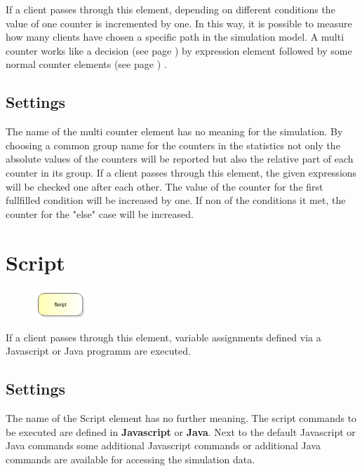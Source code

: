 If a client passes through this element, depending on different conditions the value
of one counter is incremented by one. In this way, it is possible to measure how many
clients have chosen a specific path in the simulation model. A multi counter works
like a decision (see page \pageref{ref:ModelElementDecide}) by expression element followed
by some normal counter elements (see page \pageref{ref:ModelElementCounter}) .

\subsection*{Settings}

The name of the multi counter element has no meaning for the simulation. By choosing
a common group name for the counters in the statistics not only the absolute values
of the counters will be reported but also the relative part of each counter in its
group. If a client passes through this element, the given expressions will be checked
one after each other. The value of the counter for the first fullfilled condition will
be increased by one. If non of the conditions it met, the counter for the "else" case
will be increased.


\section{Script}
\label{ref:ModelElementSetJS}

\begin{figure}
\vspace{-22pt}
\includegraphics[width=2cm]{imageModelElementSetJS.png}
\vspace{-22pt}
\end{figure}

If a client passes through this element, variable assignments defined via
a Javascript or Java programm are executed.

\subsection*{Settings}

The name of the Script element has no further meaning.
The script commands to be executed are defined in \textbf{Javascript} or \textbf{Java}.
Next to the default Javascript or Java commands some additional Javascript commands 
or additional Java commands are available for accessing the simulation data.

